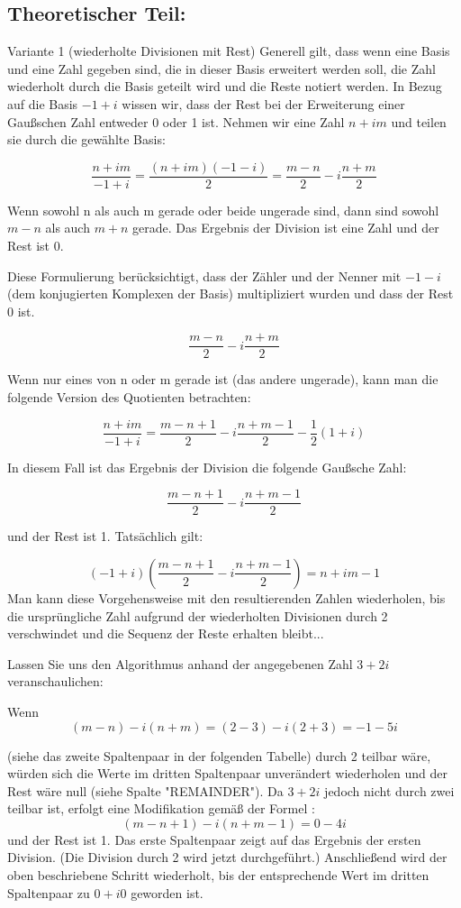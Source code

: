 \documentclass[course=erap]{aspdoc}
\begin{document}
\subsection{Theoretischer Teil:}
{Variante 1 (wiederholte Divisionen mit Rest)}
Generell gilt, dass wenn eine Basis und eine Zahl gegeben sind, die in dieser Basis erweitert werden soll, die Zahl wiederholt durch die Basis geteilt wird und die Reste notiert werden. In Bezug auf die Basis $-1+i$ wissen wir, dass der Rest bei der Erweiterung einer Gaußschen Zahl entweder 0 oder 1 ist.
\newline
\newline
Nehmen wir eine Zahl $n + im$ und teilen sie durch die gewählte Basis:

\[\frac{{n + im}}{{-1 + i}} = \frac{{(n + im)(-1 - i)}}{2} = \frac{{m - n}}{2} - i\frac{{n + m}}{2}\]

Wenn sowohl n als auch m gerade oder beide ungerade sind, dann sind sowohl $m-n$ als auch $m+n$ gerade. Das Ergebnis der Division ist eine Zahl und der Rest ist 0.

Diese Formulierung berücksichtigt, dass der Zähler und der Nenner mit $-1-i$  (dem konjugierten Komplexen der Basis) multipliziert wurden und dass der Rest 0 ist.

\[\frac{{m - n}}{{2}} - i\frac{{n + m}}{2}\]

Wenn nur eines von n oder m gerade ist (das andere ungerade), kann man die folgende Version des Quotienten betrachten:

\[\frac{{n + im}}{{-1 + i}} = \frac{{m - n + 1}}{2} - i \frac{{n + m -1}}{2} - \frac{{1}}{2}(1 + i)\]

In diesem Fall ist das Ergebnis der Division die folgende Gaußsche Zahl:

\[\frac{{m - n + 1}}{{2}} - i\frac{{n + m - 1}}{2}\]

und der Rest ist 1. Tatsächlich gilt:

\[(-1 +i) (\frac{m - n + 1}{2} - i \frac{n + m - 1}{2}) = n +im - 1\]
Man kann diese Vorgehensweise mit den resultierenden Zahlen wiederholen, bis die ursprüngliche Zahl aufgrund der wiederholten Divisionen durch 2 verschwindet und die Sequenz der Reste erhalten bleibt...
\newline

Lassen Sie uns den Algorithmus anhand der angegebenen Zahl $3 + 2i$ veranschaulichen:

Wenn
\[(m - n) - i(n+m)=(2-3) - i(2 + 3) = -1 - 5i\] 

(siehe das zweite Spaltenpaar in der folgenden Tabelle) durch 2 teilbar wäre, würden sich die Werte im dritten Spaltenpaar unverändert wiederholen und der Rest wäre null (siehe Spalte "REMAINDER"). Da $3 + 2 i$ jedoch nicht durch zwei teilbar ist, erfolgt eine Modifikation gemäß der Formel :
\[(m - n + 1) - i(n + m - 1)= 0 - 4  i\] 
und der Rest ist 1. Das erste Spaltenpaar zeigt auf das Ergebnis der ersten Division. (Die Division durch 2 wird jetzt durchgeführt.) Anschließend wird der oben beschriebene Schritt wiederholt, bis der entsprechende Wert im dritten Spaltenpaar zu $0 + i0$ geworden ist.
\\
\end{document}
